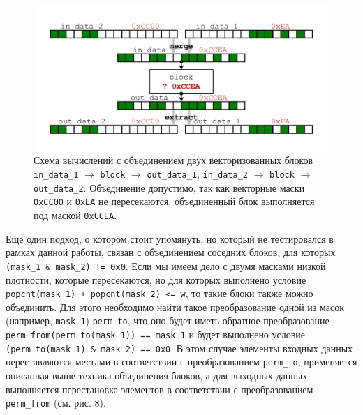 \begin{figure}[ht]
	\centering
		\includegraphics[width=1.0\textwidth]{./pics/text_4_vec_comb_mask/comb_masks.pdf}
	\caption{Схема вычислений с объединением двух векторизованных блоков \texttt{in\_data\_1} $\rightarrow$ \texttt{block} $\rightarrow$ \texttt{out\_data\_1}, \texttt{in\_data\_2} $\rightarrow$ \texttt{block} $\rightarrow$ \texttt{out\_data\_2}. Объединение допустимо, так как векторные маски \texttt{0xCC00} и \texttt{0xEA} не пересекаются, объединенный блок выполняется под маской \texttt{0xCCEA}.}
	\label{fig:text_4_vec_comb_mask_comb_masks}
\end{figure}

Еще один подход, о котором стоит упомянуть, но который не тестировался в рамках данной работы, связан с объединением соседних блоков, для которых \texttt{(mask\_1 \& mask\_2) != 0x0}.
Если мы имеем дело с двумя масками низкой плотности, которые пересекаются, но для которых выполнено условие \texttt{popcnt(mask\_1) + popcnt(mask\_2) <= w}, то такие блоки также можно объединить.
Для этого необходимо найти такое преобразование одной из масок (например, \texttt{mask\_1}) \texttt{perm\_to}, что оно будет иметь обратное преобразование \texttt{perm\_from(perm\_to(mask\_1)) == mask\_1} и будет выполнено условие \texttt{(perm\_to(mask\_1) \& mask\_2) == 0x0}.
В этом случае элементы входных данных переставляются местами в соответствии с преобразованием \texttt{perm\_to}, применяется описанная выше техника объединения блоков, а для выходных данных выполняется перестановка элементов в соответствии с преобразованием \texttt{perm\_from} (см. рис. 8).

